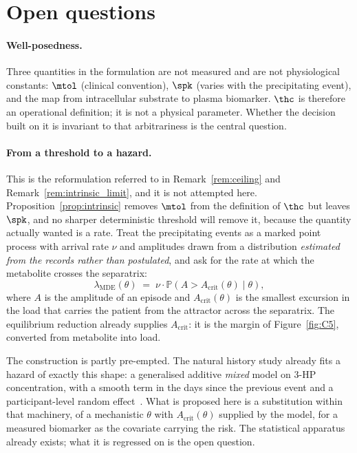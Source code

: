 \section{Open questions}

\paragraph{Well-posedness.} Three quantities in the formulation are not measured and are
not physiological constants: $\mtol$ (clinical convention), $\spk$ (varies with the
precipitating event), and the map from intracellular substrate to plasma biomarker. $\thc$
is therefore an operational definition; it is not a physical parameter. Whether the
decision built on it is invariant to that arbitrariness is the central question.

\paragraph{From a threshold to a hazard.}
\label{sec:hazard} This is the reformulation referred to in
Remark~\ref{rem:ceiling} and Remark~\ref{rem:intrinsic_limit}, and it is
not attempted here. Proposition~\ref{prop:intrinsic} removes $\mtol$ from the definition
of $\thc$ but leaves $\spk$, and no sharper deterministic threshold will remove it, because
the quantity actually wanted is a rate. Treat the precipitating events as a marked
point process with arrival rate $\nu$ and amplitudes drawn from a distribution
\emph{estimated from the records rather than postulated}, and ask for the rate at which the
metabolite crosses the separatrix:
\begin{equation}
\lambda_{\mathrm{MDE}}(\theta) \;=\; \nu \cdot
\mathbb{P}\!\left(A > A_{\mathrm{crit}}(\theta) \mid \theta \right),
\label{eq:hazard}
\end{equation}
where $A$ is the amplitude of an episode and $A_{\mathrm{crit}}(\theta)$ is the smallest
excursion in the load that carries the patient from the attractor across the separatrix.
The equilibrium reduction already supplies $A_{\mathrm{crit}}$: it is the margin of
Figure~\ref{fig:C5},
converted from metabolite into load.

The construction is partly pre-empted. The natural history study already fits a hazard of
exactly this
shape: a generalised additive \emph{mixed} model on 3-HP concentration, with a smooth term
in the days since the previous event and a participant-level random
effect~\cite{natural_history}. %
What is proposed here is a substitution within that machinery, of a mechanistic $\theta$
with $A_{\mathrm{crit}}(\theta)$ supplied by the model, for a measured biomarker as the
covariate carrying the risk. The statistical apparatus already exists; what it is
regressed on is the open question.


